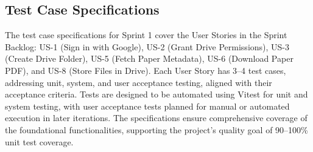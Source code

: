 \documentclass[12pt]{article}
\begin{document}
\subsection{Test Case Specifications}
The test case specifications for Sprint 1 cover the User Stories in the Sprint Backlog: US-1 (Sign in with Google), US-2 (Grant Drive Permissions), US-3 (Create Drive Folder), US-5 (Fetch Paper Metadata), US-6 (Download Paper PDF), and US-8 (Store Files in Drive). Each User Story has 3–4 test cases, addressing unit, system, and user acceptance testing, aligned with their acceptance criteria. Tests are designed to be automated using Vitest for unit and system testing, with user acceptance tests planned for manual or automated execution in later iterations. The specifications ensure comprehensive coverage of the foundational functionalities, supporting the project's quality goal of 90–100\% unit test coverage.
\end{document}
